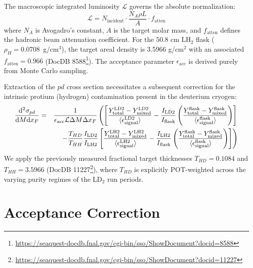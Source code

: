 \documentclass[11pt]{article}
\newcommand{\diffd}{\mathrm{d}}
\begin{document}
The macroscopic integrated luminosity $\mathcal{L}$ governs the absolute normalization:
\begin{equation}
\mathcal{L} = N_{\text{incident}} \cdot \frac{N_{A} \rho L}{A} \cdot f_{\text{atten}}
\label{eq:luminosity}
\end{equation}
where $N_A$ is Avogadro's constant, $A$ is the target molar mass, and $f_{\text{atten}}$ defines the hadronic beam attenuation coefficient. For the $50.8$ cm LH$_2$ flask ($\rho_H=0.0708$~g/cm$^3$), the target areal density is 3.5966 g/cm$^2$ with an associated $f_{\text{atten}} = 0.966$ (DocDB 8588\footnote{\url{https://seaquest-docdb.fnal.gov/cgi-bin/sso/ShowDocument?docid=8588}}). The acceptance parameter $\epsilon_{\text{acc}}$ is derived purely from Monte Carlo sampling.

Extraction of the $pd$ cross section necessitates a subsequent correction for the intrinsic protium (hydrogen) contamination present in the deuterium cryogen:
\begin{eqnarray}
    \frac{\diffd^{2}\sigma_{pd}}{\diffd M \diffd x_{F}} &=& \frac{1}{\epsilon_{\text{acc}} \mathcal{L} \Delta M \Delta x_{F}} 
    \left(
    \left[ 
        \frac{Y^{\text{LD2}}_{\text{total}} - Y^{\text{LD2}}_{\text{mixed}}}{\langle\epsilon^{\text{LD2}}_{\text{signal}}\rangle} 
        - \frac{I_{\text{LD2}}}{I_{\text{flask}}} 
        \left( \frac{Y^{\text{flask}}_{\text{total}} - Y^{\text{flask}}_{\text{mixed}}}{\langle\epsilon^{\text{flask}}_{\text{signal}}\rangle} \right)
    \right] \right. \nonumber \\
    & & \left. - \frac{T_{HD}}{T_{HH}} \frac{I_{\rm LD2}}{I_{\rm LH2}}\left[ 
        \frac{Y^{\text{LH2}}_{\text{total}} - Y^{\text{LH2}}_{\text{mixed}}}{\langle\epsilon^{\text{LH2}}_{\text{signal}}\rangle} 
        - \frac{I_{\text{LH2}}}{I_{\text{flask}}} 
        \left( \frac{Y^{\text{flask}}_{\text{total}} - Y^{\text{flask}}_{\text{mixed}}}{\langle\epsilon^{\text{flask}}_{\text{signal}}\rangle} \right)
    \right]
    \right)
    \label{eq:modified_cross_section_pd}
\end{eqnarray}
We apply the previously measured fractional target thicknesses $T_{HD}= 0.1084$ and $T_{HH}= 3.5966$ (DocDB 11227\footnote{\url{https://seaquest-docdb.fnal.gov/cgi-bin/sso/ShowDocument?docid=11227}}), where $T_{HD}$ is explicitly POT-weighted across the varying purity regimes of the LD$_2$ run periods.

\FloatBarrier
\section{Acceptance Correction}
\label{sec:acc_correction}
\end{document}
